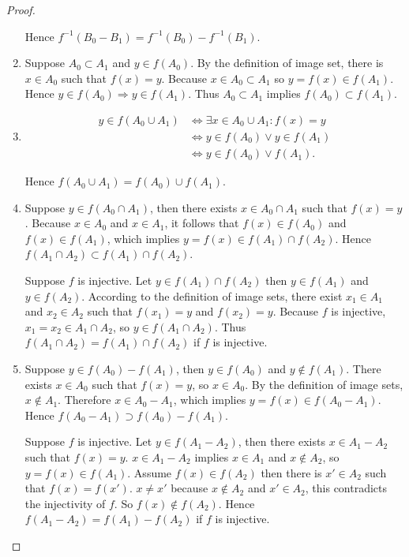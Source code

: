\begin{proof}
\begin{enumerate}[label={(\alph*)}]
              Hence $f^{-1}(B_{0} - B_{1}) = f^{-1}(B_{0}) - f^{-1}(B_{1})$.
        \item Suppose $A_{0}\subset A_{1}$ and $y\in f(A_{0})$. By the definition of image set, there is $x\in A_{0}$ such that $f(x) = y$. Because $x\in A_{0}\subset A_{1}$ so $y = f(x)\in f(A_{1})$. Hence $y\in f(A_{0})\Rightarrow y\in f(A_{1})$. Thus $A_{0}\subset A_{1}$ implies $f(A_{0})\subset f(A_{1})$.
        \item \begin{align*}
                  y\in f(A_{0}\cup A_{1}) & \Longleftrightarrow \exists x\in A_{0}\cup A_{1}: f(x) = y \\
                                          & \Longleftrightarrow y\in f(A_{0}) \lor y\in f(A_{1})       \\
                                          & \Longleftrightarrow y\in f(A_{0}) \lor f(A_{1}).
              \end{align*}

              Hence $f(A_{0}\cup A_{1}) = f(A_{0})\cup f(A_{1})$.
        \item Suppose $y\in f(A_{0}\cap A_{1})$, then there exists $x\in A_{0}\cap A_{1}$ such that $f(x) = y$. Because $x\in A_{0}$ and $x\in A_{1}$, it follows that $f(x)\in f(A_{0})$ and $f(x)\in f(A_{1})$, which implies $y = f(x)\in f(A_{1})\cap f(A_{2})$. Hence $f(A_{1}\cap A_{2})\subset f(A_{1})\cap f(A_{2})$.

              Suppose $f$ is injective. Let $y\in f(A_{1})\cap f(A_{2})$ then $y\in f(A_{1})$ and $y\in f(A_{2})$. According to the definition of image sets, there exist $x_{1}\in A_{1}$ and $x_{2}\in A_{2}$ such that $f(x_{1}) = y$ and $f(x_{2}) = y$. Because $f$ is injective, $x_{1} = x_{2}\in A_{1}\cap A_{2}$, so $y\in f(A_{1}\cap A_{2})$. Thus $f(A_{1}\cap A_{2}) = f(A_{1})\cap f(A_{2})$ if $f$ is injective.
        \item Suppose $y\in f(A_{0}) - f(A_{1})$, then $y\in f(A_{0})$ and $y\notin f(A_{1})$. There exists $x\in A_{0}$ such that $f(x) = y$, so $x\in A_{0}$. By the definition of image sets, $x\notin A_{1}$. Therefore $x\in A_{0} - A_{1}$, which implies $y = f(x)\in f(A_{0} - A_{1})$. Hence $f(A_{0} - A_{1})\supset f(A_{0}) - f(A_{1})$.

              Suppose $f$ is injective. Let $y\in f(A_{1} - A_{2})$, then there exists $x\in A_{1} - A_{2}$ such that $f(x) = y$. $x\in A_{1} - A_{2}$ implies $x\in A_{1}$ and $x\notin A_{2}$, so $y = f(x)\in f(A_{1})$. Assume $f(x)\in f(A_{2})$ then there is $x'\in A_{2}$ such that $f(x) = f(x')$. $x\ne x'$ because $x\notin A_{2}$ and $x'\in A_{2}$, this contradicts the injectivity of $f$. So $f(x)\notin f(A_{2})$. Hence $f(A_{1} - A_{2}) = f(A_{1}) - f(A_{2})$ if $f$ is injective.
    \end{enumerate}
\end{proof}

